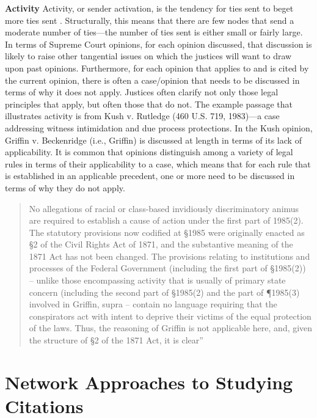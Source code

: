 \documentclass[headsepline=true, abstracton]{scrartcl}
\begin{document}
\noindent \textbf{Activity} Activity, or sender activation, is the tendency for ties sent to beget more ties sent \citep{howard2016understanding}. Structurally, this means that there are few nodes that send a moderate number of ties---the number of ties sent is either small or fairly large. In terms of Supreme Court opinions, for each opinion discussed, that discussion is likely to raise other tangential issues on which the justices will want to draw upon past opinions.  Furthermore, for each opinion that applies to and is cited by the current opinion, there is often a case/opinion that needs to be discussed in terms of why it does not apply. Justices often clarify not only those legal principles that apply, but often those that do not. The example passage that illustrates activity is from Kush v. Rutledge (460 U.S. 719, 1983)---a case addressing witness intimidation and due process protections. In the Kush opinion, Griffin v. Beckenridge (i.e., Griffin) is discussed at length in terms of its lack of applicability. It is common that opinions distinguish among a variety of legal rules in terms of their applicability to a case, which means that for each rule that is established in an applicable precedent, one or more need to be discussed in terms of why they do not apply.
\begin{quotation}
No allegations of racial or class-based invidiously discriminatory animus are required to establish a cause of action under the first part of 1985(2). The statutory provisions now codified at \S 1985 were originally enacted as \S 2 of the Civil Rights Act of 1871, and the substantive meaning of the 1871 Act has not been changed. The provisions relating to institutions and processes of the Federal Government (including the first part of \S 1985(2)) -- unlike those encompassing activity that is usually of primary state concern (including the second part of \S 1985(2) and the part of \P 1985(3) involved in Griffin, supra -- contain no language requiring that the conspirators act with intent to deprive their victims of the equal protection of the laws. Thus, the reasoning of Griffin is not applicable here, and, given the structure of \S 2 of the 1871 Act, it is clear''
\end{quotation} %



\section{Network Approaches to Studying Citations}
\end{document}
